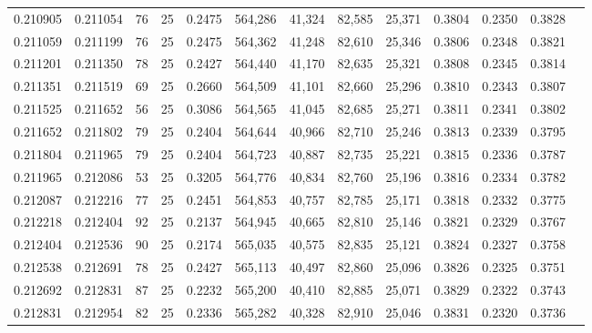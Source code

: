 \begin{tabular}{rrrrrrrrrrrrr}
0.210905 & 0.211054 &    76 &  25 &                                     0.2475 & 564,286 &  41,324 &  82,585 &  25,371 & 0.3804 & 0.2350 & 0.3828 \\
0.211059 & 0.211199 &    76 &  25 &                                     0.2475 & 564,362 &  41,248 &  82,610 &  25,346 & 0.3806 & 0.2348 & 0.3821 \\
0.211201 & 0.211350 &    78 &  25 &                                     0.2427 & 564,440 &  41,170 &  82,635 &  25,321 & 0.3808 & 0.2345 & 0.3814 \\
0.211351 & 0.211519 &    69 &  25 &                                     0.2660 & 564,509 &  41,101 &  82,660 &  25,296 & 0.3810 & 0.2343 & 0.3807 \\
0.211525 & 0.211652 &    56 &  25 &                                     0.3086 & 564,565 &  41,045 &  82,685 &  25,271 & 0.3811 & 0.2341 & 0.3802 \\
0.211652 & 0.211802 &    79 &  25 &                                     0.2404 & 564,644 &  40,966 &  82,710 &  25,246 & 0.3813 & 0.2339 & 0.3795 \\
0.211804 & 0.211965 &    79 &  25 &                                     0.2404 & 564,723 &  40,887 &  82,735 &  25,221 & 0.3815 & 0.2336 & 0.3787 \\
0.211965 & 0.212086 &    53 &  25 &                                     0.3205 & 564,776 &  40,834 &  82,760 &  25,196 & 0.3816 & 0.2334 & 0.3782 \\
0.212087 & 0.212216 &    77 &  25 &                                     0.2451 & 564,853 &  40,757 &  82,785 &  25,171 & 0.3818 & 0.2332 & 0.3775 \\
0.212218 & 0.212404 &    92 &  25 &                                     0.2137 & 564,945 &  40,665 &  82,810 &  25,146 & 0.3821 & 0.2329 & 0.3767 \\
0.212404 & 0.212536 &    90 &  25 &                                     0.2174 & 565,035 &  40,575 &  82,835 &  25,121 & 0.3824 & 0.2327 & 0.3758 \\
0.212538 & 0.212691 &    78 &  25 &                                     0.2427 & 565,113 &  40,497 &  82,860 &  25,096 & 0.3826 & 0.2325 & 0.3751 \\
0.212692 & 0.212831 &    87 &  25 &                                     0.2232 & 565,200 &  40,410 &  82,885 &  25,071 & 0.3829 & 0.2322 & 0.3743 \\
0.212831 & 0.212954 &    82 &  25 &                                     0.2336 & 565,282 &  40,328 &  82,910 &  25,046 & 0.3831 & 0.2320 & 0.3736 \\

\end{tabular}
